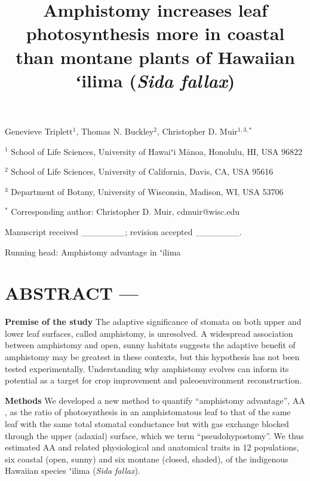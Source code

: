 \documentclass[
  letterpaper,
  DIV=11,
  numbers=noendperiod]{scrartcl}
\title{Amphistomy increases leaf photosynthesis more in coastal than
montane plants of Hawaiian ʻilima (\emph{Sida fallax})}
\author{}
\date{}
\begin{document}
\maketitle
\ifdefined\Shaded\renewenvironment{Shaded}{\begin{tcolorbox}[interior hidden, enhanced, frame hidden, borderline west={3pt}{0pt}{shadecolor}, breakable, boxrule=0pt, sharp corners]}{\end{tcolorbox}}\fi

\begin{center}
Genevieve Triplett$^1$, Thomas N. Buckley$^2$, Christopher D. Muir$^{1,3,*}$
\end{center}

\(^1\) School of Life Sciences, University of Hawaiʻi Mānoa, Honolulu,
HI, USA 96822

\(^2\) School of Life Sciences, University of California, Davis, CA, USA
95616

\(^3\) Department of Botany, University of Wisconsin, Madison, WI, USA
53706

\(^*\) Corresponding author: Christopher D. Muir, cdmuir@wisc.edu

Manuscript received \_\_\_\_\_\_\_; revision accepted \_\_\_\_\_\_\_.

Running head: Amphistomy advantage in ʻilima

\newpage

\hypertarget{abstract}{%
\section{ABSTRACT ---}\label{abstract}}

\noindent \textbf{Premise of the study} The adaptive significance of
stomata on both upper and lower leaf surfaces, called amphistomy, is
unresolved. A widespread association between amphistomy and open, sunny
habitats suggests the adaptive benefit of amphistomy may be greatest in
these contexts, but this hypothesis has not been tested experimentally.
Understanding why amphistomy evolves can inform its potential as a
target for crop improvement and paleoenvironment reconstruction.

\textbf{Methods} We developed a new method to quantify ``amphistomy
advantage'', \(\mathrm{AA}\), as the ratio of photosynthesis in an
amphistomatous leaf to that of the same leaf with the same total
stomatal conductance but with gas exchange blocked through the upper
(adaxial) surface, which we term ``pseudohypostomy''. We thus estimated
\(\mathrm{AA}\) and related physiological and anatomical traits in 12
populations, six coastal (open, sunny) and six montane (closed, shaded),
of the indigenous Hawaiian species ʻilima (\emph{Sida fallax}).
\end{document}
